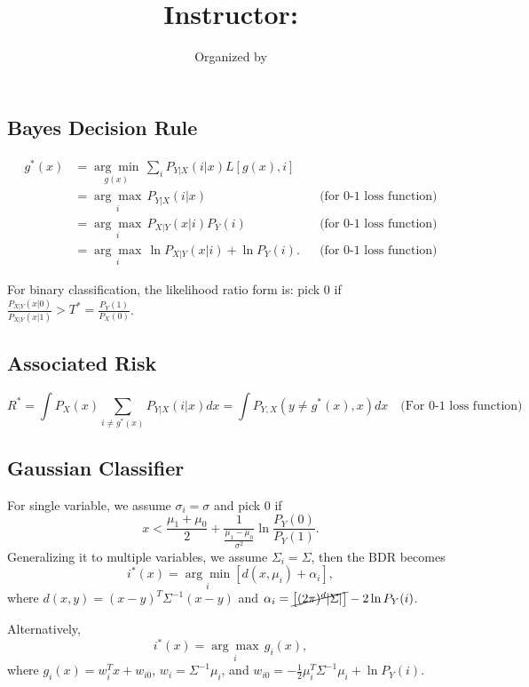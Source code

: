 \documentclass{article}
\title{
    \vspace{2in}
    \textsc{\Large\hmwkInstitution} \\
    \vspace{0.2in}
    \textmd{\textbf{\hmwkTitle}}\\
    \vspace{0.2in}\large{Instructor: \textit{\hmwkInstructor}}
}
\author{
  Organized by \hmwkAuthorName
}
\date{}
\newenvironment{topic}[1]{\subsection*{#1}}{}
\begin{document}
\maketitle

\thispagestyle{empty}
\clearpage
{} 

\pagebreak





\begin{topic}{Bayes Decision Rule}
    \begin{align*}
        g^*(x) 
        &= \underset{g(x)}{\arg \min} \, \sum_i P_{Y|X}(i|x)L[g(x), i] \\
        &= \underset{i}{\arg \max} \, P_{Y|X}(i|x) && \text{(for 0-1 loss function)} \\
        &= \underset{i}{\arg \max} \, P_{X|Y}(x|i)P_Y(i) && \text{(for 0-1 loss function)} \\
        &= \underset{i}{\arg \max} \, \ln P_{X|Y}(x|i) + \ln P_Y(i). && \text{(for 0-1 loss function)}
    \end{align*}
    
    For binary classification, the likelihood ratio form is: pick $0$ if $\frac{P_{X|Y}(x|0)}{P_{X|Y}(x|1)} > T^* = \frac{P_Y(1)}{P_X(0)}$.
\end{topic}

\begin{topic}{Associated Risk}
    \[
        R^* = \int P_X(x) \sum_{i \neq g^*(x)} P_{Y|X}(i|x) dx = \int P_{Y,X}(y \neq g^*(x), x) dx \quad \text{(For 0-1 loss function)}
    \]
\end{topic}

\begin{topic}{Gaussian Classifier}
    For single variable, we assume $\sigma_i = \sigma$ and pick 0 if
    \[
        x < \frac{\mu_1 + \mu_0}{2} + \frac{1}{\frac{\mu_1 - \mu_0}{\sigma^2}}\ln \frac{P_Y(0)}{P_Y(1)}.
    \]
    Generalizing it to multiple variables, we assume $\Sigma_i = \Sigma$, then the BDR becomes
    \[
        i^*(x) = \underset{i}{\arg \min}[d(x, \mu_i) + \alpha_i],
    \]
    where $d(x, y) = (x - y)^T\Sigma^{-1}(x - y)$ and $\alpha_i = \cancel{\left[(2\pi)^d|\Sigma|\right]} - 2\ln P_Y(i)$.

    Alternatively,
    \[
        i^*(x) = \underset{i}{\arg \max} \, g_i(x),
    \]
    where $g_i(x) = w_i^Tx + w_{i0}$, $w_i = \Sigma^{-1}\mu_i$, and $w_{i0} = -\frac{1}{2}\mu_i^T\Sigma^{-1}\mu_i + \ln P_Y(i)$.
\end{topic}
\end{document}
